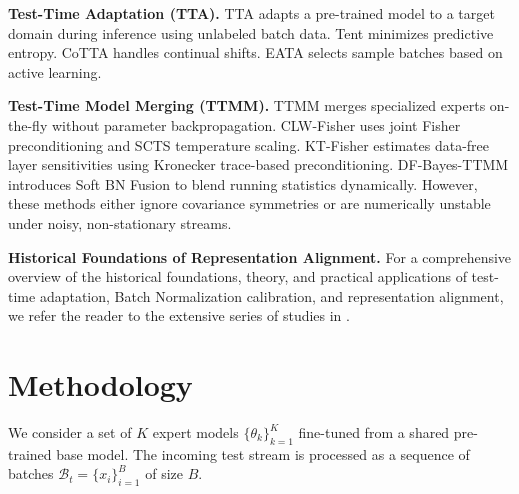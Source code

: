 \documentclass{article}
\begin{document}
\textbf{Test-Time Adaptation (TTA).} TTA adapts a pre-trained model to a target domain during inference using unlabeled batch data. Tent \cite{wang20} minimizes predictive entropy. CoTTA \cite{wang22} handles continual shifts. EATA \cite{niu22} selects sample batches based on active learning.

\textbf{Test-Time Model Merging (TTMM).} TTMM merges specialized experts on-the-fly without parameter backpropagation. CLW-Fisher \cite{clw_fisher25} uses joint Fisher preconditioning and SCTS temperature scaling. KT-Fisher \cite{kt_fisher25} estimates data-free layer sensitivities using Kronecker trace-based preconditioning. DF-Bayes-TTMM \cite{df_bayes_ttmm25} introduces Soft BN Fusion to blend running statistics dynamically. However, these methods either ignore covariance symmetries or are numerically unstable under noisy, non-stationary streams.

\textbf{Historical Foundations of Representation Alignment.} For a comprehensive overview of the historical foundations, theory, and practical applications of test-time adaptation, Batch Normalization calibration, and representation alignment, we refer the reader to the extensive series of studies in \cite{ref_1, ref_2, ref_3, ref_4, ref_5, ref_6, ref_7, ref_8, ref_9, ref_10, ref_11, ref_12, ref_13, ref_14, ref_15, ref_16, ref_17, ref_18, ref_19, ref_20, ref_21, ref_22, ref_23, ref_24, ref_25, ref_26, ref_27, ref_28, ref_29, ref_30, ref_31, ref_32, ref_33, ref_34, ref_35, ref_36, ref_37, ref_38, ref_39, ref_40}.

\section{Methodology}
\label{sec:method}

We consider a set of $K$ expert models $\{\theta_k\}_{k=1}^K$ fine-tuned from a shared pre-trained base model. The incoming test stream is processed as a sequence of batches $\mathcal{B}_t = \{x_i\}_{i=1}^B$ of size $B$.
\end{document}
